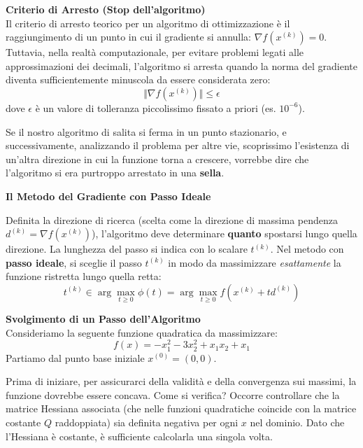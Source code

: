 \documentclass[12pt, a4paper]{article}
\newcommand{\separatore}{\noindent{\color{titlecolor!50}\rule{\textwidth}{0.6pt}}}
\begin{document}
	\vspace{0.4cm}
	\textbf{Criterio di Arresto (Stop dell'algoritmo)}\\
	Il criterio di arresto teorico per un algoritmo di ottimizzazione è il raggiungimento di un punto in cui il gradiente si annulla: $\nabla f(x^{(k)}) = 0$. 
	Tuttavia, nella realtà computazionale, per evitare problemi legati alle approssimazioni dei decimali, l'algoritmo si arresta quando la norma del gradiente diventa sufficientemente minuscola da essere considerata zero:
	\[ \Vert \nabla f(x^{(k)}) \Vert \le \epsilon \]
	dove $\epsilon$ è un valore di tolleranza piccolissimo fissato a priori (es. $10^{-6}$).
	
	Se il nostro algoritmo di salita si ferma in un punto stazionario, e successivamente, analizzando il problema per altre vie, scoprissimo l'esistenza di un'altra direzione in cui la funzione torna a crescere, vorrebbe dire che l'algoritmo si era purtroppo arrestato in una \textbf{sella}.
	
	\vspace{0.6cm}
	\separatore
	\vspace{0.4cm}
	
	\textbf{Il Metodo del Gradiente con Passo Ideale}
	
	Definita la direzione di ricerca (scelta come la direzione di massima pendenza $d^{(k)} = \nabla f(x^{(k)})$), l'algoritmo deve determinare \textbf{quanto} spostarsi lungo quella direzione. La lunghezza del passo si indica con lo scalare $t^{(k)}$.
	Nel metodo con \textbf{passo ideale}, si sceglie il passo $t^{(k)}$ in modo da massimizzare \textit{esattamente} la funzione ristretta lungo quella retta:
	\[ t^{(k)} \in \arg\max_{t \ge 0} \phi(t) = \arg\max_{t \ge 0} f\left(x^{(k)} + t d^{(k)}\right) \]
	
	\vspace{0.4cm}
	\textbf{Svolgimento di un Passo dell'Algoritmo}\\
	Consideriamo la seguente funzione quadratica da massimizzare:
	\[ f(x) = -x_1^2 - 3x_2^2 + x_1 x_2 + x_1 \]
	Partiamo dal punto base iniziale $x^{(0)} = (0,0)$.
	
	Prima di iniziare, per assicurarci della validità e della convergenza sui massimi, la funzione dovrebbe essere concava. Come si verifica? Occorre controllare che la matrice Hessiana associata (che nelle funzioni quadratiche coincide con la matrice costante $Q$ raddoppiata) sia definita negativa per ogni $x$ nel dominio. Dato che l'Hessiana è costante, è sufficiente calcolarla una singola volta.
	
\end{document}
